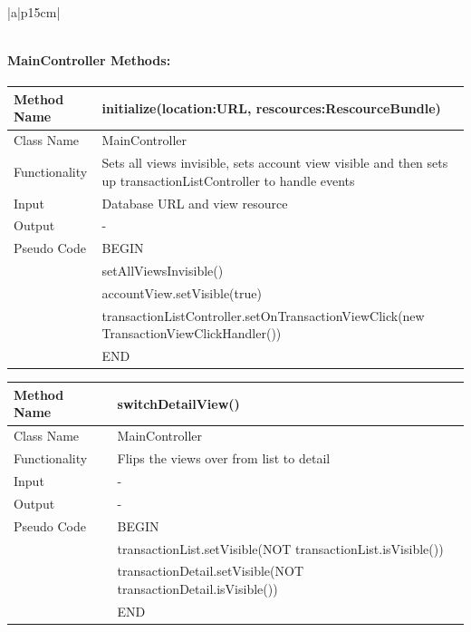 \documentclass[12pt]{article}
\begin{document}
\begin{table}[H]
\begin{tabular}{|a|p{15cm}|}
\begin{tabular}{| p{1.5cm} | p{6.5cm} | p{5.9cm} |}
		\end{tabular}								 
	\end{tabular}
\end{table}

\paragraph{MainController Methods:}
\begin{tabular}{ |p{3cm}||p{\colWidth}|  }
	\hline
	Method Name &  initialize(location:URL, rescources:RescourceBundle) \\
	\hline
	Class Name & MainController\\
	\hline
	Functionality & Sets all views invisible, sets account view visible and then sets up transactionListController to handle events\\
	\hline
	Input & Database URL and view resource\\
	\hline
	Output & -\\
	\hline
	Pseudo Code & BEGIN\\
	& setAllViewsInvisible() \\
	& accountView.setVisible(true) \\
	& transactionListController.setOnTransactionViewClick(new TransactionViewClickHandler()) \\
	& END\\
	\hline
\end{tabular}  

\begin{tabular}{ |p{3cm}||p{\colWidth}|  }
	\hline
	Method Name &  switchDetailView() \\
	\hline
	Class Name & MainController\\
	\hline
	Functionality & Flips the views over from list to detail\\
	\hline
	Input &-\\
	\hline
	Output & -\\
	\hline
	Pseudo Code & BEGIN\\
	& transactionList.setVisible(NOT transactionList.isVisible()) \\
	& transactionDetail.setVisible(NOT transactionDetail.isVisible()) \\
	& END\\
	\hline
\end{tabular}
\end{document}
